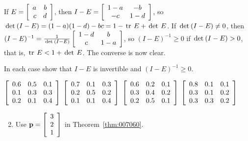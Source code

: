 \begin{multicols}{2}
\begin{ex}
\begin{sol}
If $E = \left[ \begin{array}{rr}
	a & b \\
	c & d
\end{array} \right]$,
 then $I - E = \left[ \begin{array}{cc}
 1 - a & -b \\
 -c & 1 - d
 \end{array} \right]$,
 so $\thinspace\operatorname{det\medspace}(I - E) = (1 - a)(1 - d) - bc = 1 - \thinspace\operatorname{tr \medspace}E + \thinspace\operatorname{det \medspace}E$. If $\thinspace\operatorname{det\medspace}(I - E) \neq 0$, then $(I - E)^{-1} = \tfrac{1}{\thinspace\operatorname{det\medspace}(I - E)} \left[ \begin{array}{cc}
 1 - d & b \\
 c & 1 - a
 \end{array} \right]$, so $(I - E)^{-1} \geq 0$ if $\thinspace\operatorname{det\medspace}(I - E) > 0$, that is, $\thinspace\operatorname{tr \medspace}E < 1 + \thinspace\operatorname{det \medspace} E$.
 The converse is now clear.
\end{sol}
\end{ex}

\begin{ex}
In each case show that $I - E$ is invertible and $(I - E)^{-1} \geq 0$.
\begin{exenumerate}
\exitem $\left[ \begin{array}{rrr}
0.6 & 0.5 & 0.1 \\
0.1 & 0.3 & 0.3 \\
0.2 & 0.1 & 0.4
\end{array} \right]$
\exitem $\left[ \begin{array}{rrr}
0.7 & 0.1 & 0.3 \\
0.2 & 0.5 & 0.2 \\
0.1 & 0.1 & 0.4
\end{array} \right]$
\exitem $\left[ \begin{array}{rrr}
0.6 & 0.2 & 0.1 \\
0.3 & 0.4 & 0.2 \\
0.2 & 0.5 & 0.1
\end{array} \right]$
\exitem $\left[ \begin{array}{rrr}
0.8 & 0.1 & 0.1 \\
0.3 & 0.1 & 0.2 \\
0.3 & 0.3 & 0.2
\end{array} \right]$
\end{exenumerate}
\begin{sol}
\begin{enumerate}[label={\alph*.}]
\setcounter{enumi}{1}
\item  Use $\textbf{p} = \left[ \begin{array}{r}
3 \\
2 \\
1
\end{array} \right]$
 in Theorem~\ref{thm:007060}.


\end{enumerate}
\end{sol}
\end{ex}
\end{multicols}
